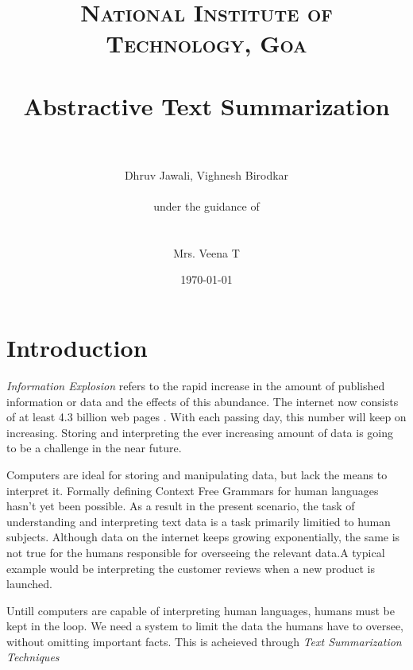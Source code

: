 \documentclass[paper=a4, fontsize=11pt]{scrartcl} %
\title{	
\normalfont \normalsize 
\textsc{National Institute of Technology, Goa} \\ [25pt] %
\horrule{0.5pt} \\[0.4cm] %
\huge Abstractive Text Summarization \\ %
\horrule{2pt} \\[0.5cm] %
}
\author{Dhruv Jawali, Vighnesh Birodkar \\
\\
\small{under the guidance of} \\
\\
\\
Mrs. Veena T
} %
\date{\normalsize\today} %
\numberwithin{equation}{section} %
\numberwithin{figure}{section} %
\numberwithin{table}{section} %
\begin{document}
\maketitle %
\pagebreak
\tableofcontents
\pagebreak




\section{Introduction}
\emph{Information Explosion} \cite{fshock} refers to the rapid increase in the amount of published information or data and the effects of this abundance. The internet now consists of at least 4.3 billion web pages \cite{websize}. With each passing day, this number will keep on increasing. Storing and interpreting the ever increasing amount of data is going to be a challenge in the near future.\\
\par
Computers are ideal for storing and manipulating data, but lack the means to interpret it. Formally defining Context Free Grammars for human languages hasn't yet been possible. As a result in the present scenario, the task of understanding and interpreting text data is a task primarily limitied to human subjects. Although data on the internet keeps growing exponentially, the same is not true for the humans responsible for overseeing the relevant data.A typical example would be interpreting the customer reviews when a new product is launched.\\
\par
Untill computers are capable of interpreting human languages, humans must be kept in the loop. We need a system to limit the data the humans have to oversee, without omitting important facts. This is acheieved through \emph{Text Summarization Techniques}



{}

\end{document}
